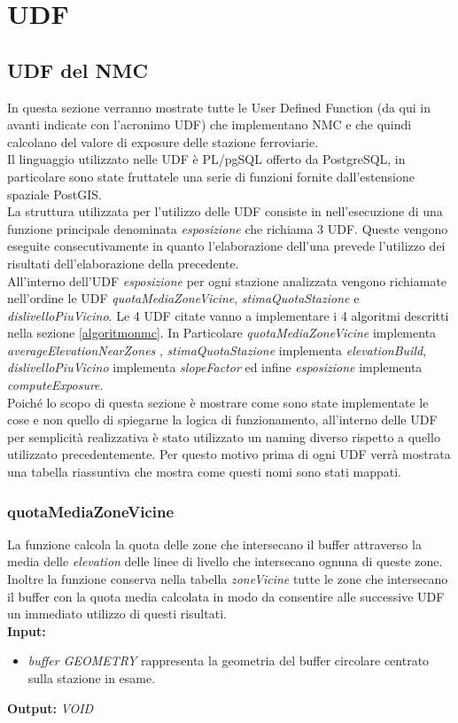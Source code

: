 \chapter{UDF}
\label{udf}
\section{UDF del NMC}
\label{udfnmc}
\justify
In questa sezione verranno mostrate tutte le User Defined Function (da qui in avanti indicate con l'acronimo UDF) che implementano NMC e che quindi calcolano del valore di exposure delle stazione ferroviarie.\\ Il linguaggio utilizzato nelle UDF è PL/pgSQL offerto da PostgreSQL, in particolare sono state fruttatele una serie di funzioni fornite dall’estensione spaziale PostGIS.\\
La struttura utilizzata per l'utilizzo delle UDF consiste in nell'esecuzione di una funzione principale denominata \textit{esposizione} che richiama 3 UDF. Queste vengono eseguite consecutivamente in quanto l'elaborazione dell'una prevede l'utilizzo dei risultati dell'elaborazione della precedente. \\
All'interno dell'UDF \textit{esposizione} per ogni stazione analizzata vengono richiamate nell'ordine le UDF \textit{quotaMediaZoneVicine}, \textit{stimaQuotaStazione} e \textit{dislivelloPiuVicino}. Le 4 UDF citate vanno a implementare i 4 algoritmi descritti nella sezione \ref{algoritmonmc}. In Particolare \textit{quotaMediaZoneVicine} implementa \textit{averageElevationNearZones} , \textit{stimaQuotaStazione} implementa \textit{elevationBuild}, \textit{dislivelloPiuVicino} implementa \textit{slopeFactor} ed infine \textit{esposizione} implementa \textit{computeExposure}.\\
Poiché lo scopo di questa sezione è mostrare come sono state implementate le cose e non quello di spiegarne la logica di funzionamento, all'interno delle UDF per semplicità realizzativa è stato utilizzato un naming diverso rispetto a quello utilizzato precedentemente. Per questo motivo prima di ogni UDF verrà mostrata una tabella riassuntiva che mostra come questi nomi sono stati mappati.   

\subsection{quotaMediaZoneVicine}
La funzione calcola la quota delle zone che intersecano il buffer attraverso la media delle \textit{elevation} delle linee di livello che intersecano ognuna di queste zone. Inoltre la funzione conserva nella tabella \textit{zoneVicine} tutte le zone che intersecano il buffer con la quota media calcolata in modo da consentire alle successive UDF un immediato utilizzo di questi risultati.\\
\textbf{Input:} 
\begin{itemize}
\item \textit{buffer GEOMETRY} rappresenta la geometria del buffer circolare centrato sulla stazione in esame.
\end{itemize}
\textbf{Output:} \textit{VOID} 

